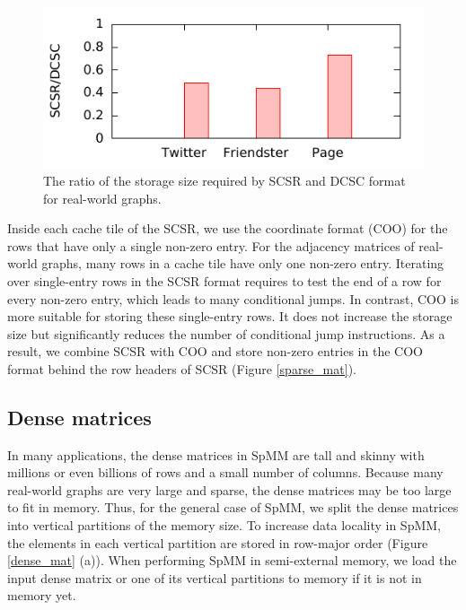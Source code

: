 \begin{figure}
	\begin{center}
		\footnotesize
		\includegraphics[scale=1]{SpMM_figs/storage.pdf}
		\caption{The ratio of the storage size required by SCSR and DCSC
		\cite{Buluc08} format for real-world graphs.}
		\label{fig:storage}
	\end{center}
\end{figure}

Inside each cache tile of the SCSR, we use the coordinate format (COO) for
the rows that have only a single non-zero entry. For the adjacency matrices of
real-world graphs, many rows in a cache tile have only one non-zero entry.
Iterating over single-entry rows in the SCSR format requires to test
the end of a row for every non-zero entry, which leads to many conditional jumps.
In contrast, COO is more suitable for storing these
single-entry rows. It does not increase the storage size but significantly
reduces the number of conditional jump instructions. As a result, we combine
SCSR with COO and store non-zero entries in the COO format behind the row headers
of SCSR (Figure \ref{sparse_mat}).


\subsection{Dense matrices}
In many applications, the dense matrices in SpMM are tall and skinny with
millions or even billions of rows and a small number of columns.
Because many real-world graphs
are very large and sparse, the dense matrices may be too large to fit in memory.
Thus, for the general case of SpMM, we split the dense matrices into vertical
partitions of the memory size. To increase data locality in SpMM, the elements
in each vertical partition are stored in row-major order (Figure \ref{dense_mat}
(a)). When performing SpMM in semi-external memory, we load the input dense
matrix or one of its vertical partitions to memory if it is not in memory yet.

